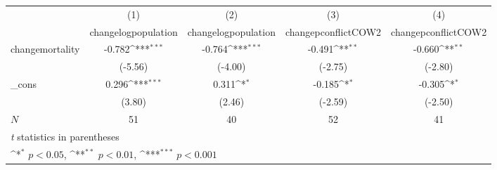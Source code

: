 {
\def\sym#1{\ifmmode^{#1}\else\(^{#1}\)\fi}
\begin{tabular}{l*{4}{c}}
\hline\hline
            &\multicolumn{1}{c}{(1)}&\multicolumn{1}{c}{(2)}&\multicolumn{1}{c}{(3)}&\multicolumn{1}{c}{(4)}\\
            &\multicolumn{1}{c}{changelogpopulation}&\multicolumn{1}{c}{changelogpopulation}&\multicolumn{1}{c}{changepconflictCOW2}&\multicolumn{1}{c}{changepconflictCOW2}\\
\hline
changemortality&      -0.782\sym{***}&      -0.764\sym{***}&      -0.491\sym{**} &      -0.660\sym{**} \\
            &     (-5.56)         &     (-4.00)         &     (-2.75)         &     (-2.80)         \\
[1em]
\_cons      &       0.296\sym{***}&       0.311\sym{*}  &      -0.185\sym{*}  &      -0.305\sym{*}  \\
            &      (3.80)         &      (2.46)         &     (-2.59)         &     (-2.50)         \\
\hline
\(N\)       &          51         &          40         &          52         &          41         \\
\hline\hline
\multicolumn{5}{l}{\footnotesize \textit{t} statistics in parentheses}\\
\multicolumn{5}{l}{\footnotesize \sym{*} \(p<0.05\), \sym{**} \(p<0.01\), \sym{***} \(p<0.001\)}\\
\end{tabular}
}
